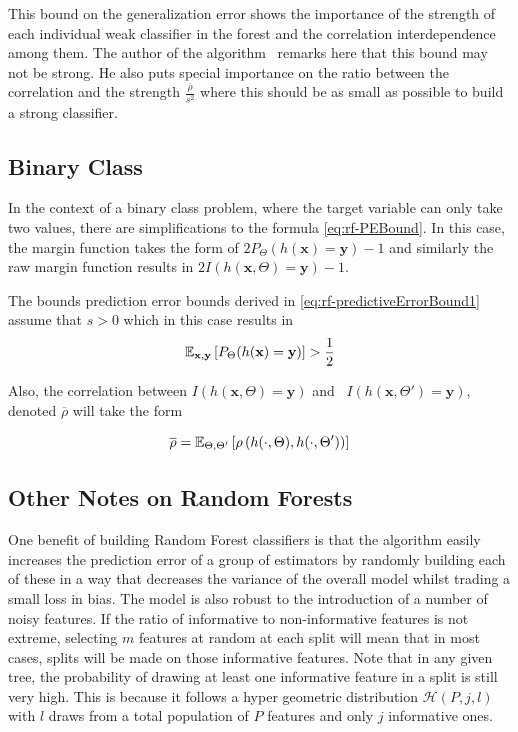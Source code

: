 This bound on the generalization error shows the importance of the strength of each individual weak classifier in the forest and the correlation interdependence among them. 
The author of the algorithm~\cite{breiman-randomforests} remarks here that this bound may not be strong. 
He also puts special importance on the ratio between the correlation and the strength $\frac{\overline{\rho}}{s^2}$ where this should be as small as possible to build a strong classifier.


\subsection{Binary Class}\label{subsection:random_forests_binary_class}

In the context of a binary class problem, where the target variable can only take two values, there are simplifications to the formula \cref{eq:rf-PEBound}. 
In this case, the margin function takes the form of $2 P_{\Theta}(h(\textbf{x}) = \textbf{y}) -1$ and similarly the raw margin function results in $2 I(h(\textbf{x}, \Theta) = \textbf{y}) -1$.


The bounds prediction error bounds derived in \cref{eq:rf-predictiveErrorBound1} assume that $s >0$ which in this case results in
\begin{equation}
\operatorname{\mathbb{E}}_{\textbf{x},\textbf{y}} \left[ P_{\Theta}(h(\textbf{x}) = \textbf{y}) \right] > \frac{1}{2}
\end{equation}


Also, the correlation between $I(h(\textbf{x}, \Theta) = \textbf{y})$ and \ $I(h(\textbf{x}, \Theta') = \textbf{y})$, denoted $\overline{\rho}$ will take the form

\begin{equation}
 \overline{\rho} = \operatorname{\mathbb{E}}_{\Theta,\Theta'} \left[ \rho \left( h(\cdot{},\Theta) ,h(\cdot{},\Theta') \right)  \right]
 \end{equation}



%


\subsection{Other Notes on Random Forests}\label{subsection:random_forests_other_notes}

One benefit of building Random Forest classifiers is that the algorithm easily increases the prediction error of a group of estimators by randomly building each of these in a way that decreases the variance of the overall model whilst trading a small loss in bias. 
The model is also robust to the introduction of a number of noisy features. 
If the ratio of informative to non-informative features is not extreme, selecting $m$ features at random at each split will mean that in most cases, splits will be made on those informative features. 
Note that in any given tree, the probability of drawing at least one informative feature in a split is still very high. 
This is because it follows a hyper geometric distribution $\mathcal{H}(P,j,l)$ with $l$ draws from a total population of $P$ features and only $j$ informative ones.

